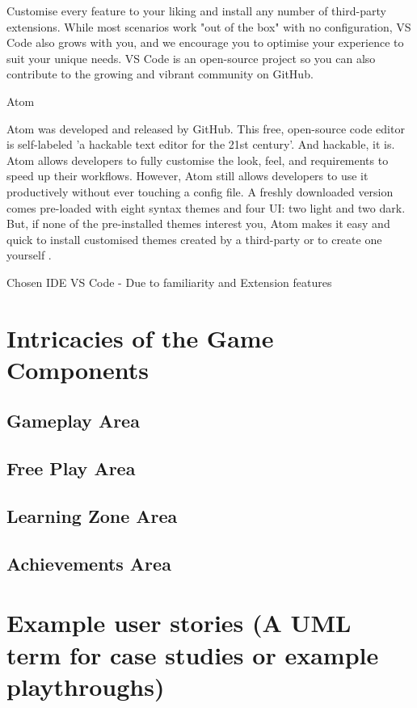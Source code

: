 	Customise every feature to your liking and install any number of third-party extensions. While most scenarios work "out of the box" with no configuration, VS Code also grows with you, and we encourage you to optimise your experience to suit your unique needs. VS Code is an open-source project so you can also contribute to the growing and vibrant community on GitHub.
	
	
	Atom
	
	Atom was developed and released by GitHub. This free, open-source code editor is self-labeled 'a hackable text editor for the 21st century'. And hackable, it is. Atom allows developers to fully customise the look, feel, and requirements to speed up their workflows.
	However, Atom still allows developers to use it productively without ever touching a config file. A freshly downloaded version comes pre-loaded with eight syntax themes and four UI: two light and two dark. But, if none of the pre-installed themes interest you, Atom makes it easy and quick to install customised themes created by a third-party or to create one yourself \cite{atom_explain}.
	
	
	Chosen IDE
	VS Code -  Due to familiarity and Extension features
	
	
	\section{Intricacies of the Game Components}
	\label{sec:packages_used}
	
	\subsection{Gameplay Area}
	
	\subsection{Free Play Area}
	
	\subsection{Learning Zone Area}
	
	\subsection{Achievements Area}
	
	
	\section{Example user stories (A UML term for case studies or example playthroughs)}
	\label{sec:ide_used}
	
	
	
